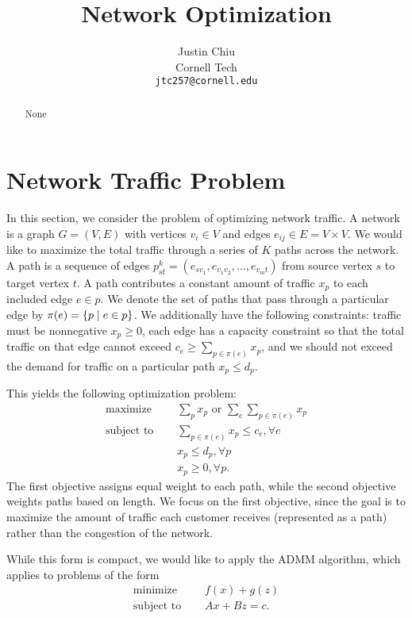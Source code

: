 \documentclass[11pt]{article}
\title{Network Optimization}
\author{Justin Chiu \\
  Cornell Tech \\
  \texttt{jtc257@cornell.edu}}
\begin{document}
\maketitle
\begin{abstract}
None
\end{abstract}

\section{Network Traffic Problem}
In this section, we consider the problem of optimizing network traffic.
A network is a graph $G = (V,E)$ with vertices $v_i\in V$ and edges
$e_{ij}\in E = V\times V$.
We would like to maximize the total traffic through a series of $K$ paths across the network.
A path is a sequence of edges $p_{st}^k = (e_{sv_1},e_{v_1v_2},\ldots,e_{v_mt})$
from source vertex $s$ to target vertex $t$.
A path contributes a constant amount of traffic $x_p$ to each included edge $e\in p$.
We denote the set of paths that pass through a particular edge by
$\pi(e) = \left\{p \mid e \in p\right\}$.
We additionally have the following constraints: traffic must be nonnegative $x_p \geq 0$,
each edge has a capacity constraint so that the total traffic on that
edge cannot exceed $ c_e \ge \sum_{p\in\pi(e)} x_p $,
and we should not exceed the demand for traffic on a particular path $x_p \leq d_p$.

This yields the following optimization problem:
\begin{equation}
\label{eqn:network-opt}
\begin{aligned}
\textrm{maximize } \quad & \sum_{p} x_p \textrm{ or } \sum_{e} \sum_{p\in\pi(e)}x_{p}\\
\textrm{subject to } \quad &\sum_{p\in\pi(e)}x_p \le c_e, \forall e\\
&x_p \le d_p, \forall p\\
& x_p \geq 0, \forall p.
\end{aligned}
\end{equation}
The first objective assigns equal weight to each path, while the second
objective weights paths based on length.
We focus on the first objective, since the goal is to maximize the amount of traffic
each customer receives (represented as a path) rather than the congestion
of the network.

While this form is compact, we would like to apply the ADMM algorithm,
which applies to problems of the form
\begin{equation}
\label{eqn:admm}
\begin{aligned}
\textrm{minimize } \quad & f(x) + g(z)\\
\textrm{subject to } \quad & Ax + Bz = c.
\end{aligned}
\end{equation}
\end{document}
